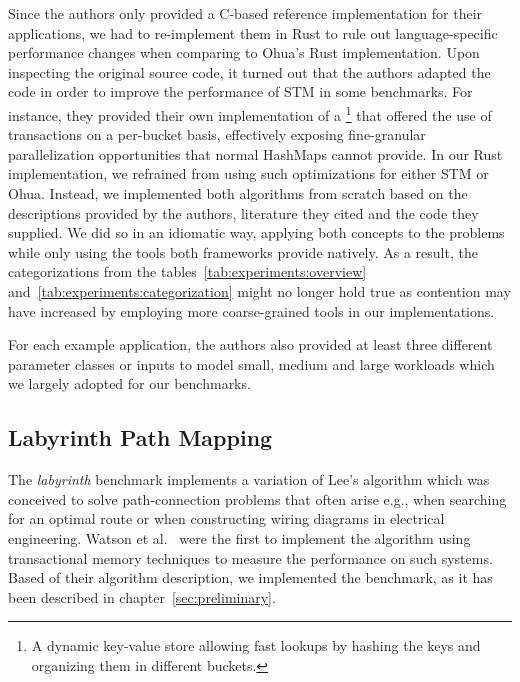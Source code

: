 Since the authors only provided a C-based reference implementation for their applications, we had to re-implement them in Rust to rule out language-specific performance changes when comparing to Ohua's Rust implementation.
Upon inspecting the original source code, it turned out that the authors adapted the code in order to improve the performance of STM in some benchmarks.
For instance, they provided their own implementation of a \footnote{A dynamic key-value store allowing fast lookups by hashing the keys and organizing them in different buckets.} that offered the use of transactions on a per-bucket basis, effectively exposing fine-granular parallelization opportunities that normal HashMaps cannot provide.
In our Rust implementation, we refrained from using such optimizations for either STM or Ohua.
Instead, we implemented both algorithms from scratch based on the descriptions provided by the authors, literature they cited and the code they supplied.
We did so in an idiomatic way, applying both concepts to the problems while only using the tools both frameworks provide natively.
As a result, the categorizations from the tables~\ref{tab:experiments:overview} and~\ref{tab:experiments:categorization} might no longer hold true as contention may have increased by employing more coarse-grained tools in our implementations.

For each example application, the authors also provided at least three different parameter classes or inputs to model small, medium and large workloads which we largely adopted for our benchmarks.



\subsection{Labyrinth Path Mapping}
The \emph{labyrinth} benchmark implements a variation of Lee's algorithm \cite{lee1961algorithm} which was conceived to solve path-connection problems that often arise e.g., when searching for an optimal route or when constructing wiring diagrams in electrical engineering.
Watson et al.~\cite{watson2007study} were the first to implement the algorithm using transactional memory techniques to measure the performance on such systems.
Based of their algorithm description, we implemented the benchmark, as it has been described in chapter~\ref{sec:preliminary}.

